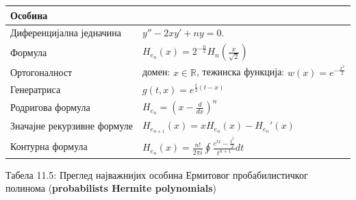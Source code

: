 {\def\LTcaptype{none} %
\begin{longtable}[]{@{}
  >{\raggedright\arraybackslash}p{}
  >{\centering\arraybackslash}p{}@{}}
\toprule\noalign{}
\begin{minipage}[b]{\linewidth}\raggedright
Особина
\end{minipage} & \begin{minipage}[b]{\linewidth}\centering
\end{minipage} \\
\midrule\noalign{}
\endhead
\bottomrule\noalign{}
\endlastfoot
Диференцијална једначина & \(y'' - 2xy' + ny = 0\). \\
Формула &
\(H_{e_{n}}(x) = 2^{- \frac{n}{2}}H_{n}(\frac{x}{\sqrt{2}})\) \\
Ортогоналност & домен: \(x\mathbb{\in R}\), тежинска функција:
\(w\overset{}{(x)} = e^{- \frac{x^{2}}{2}}\) \\
Генератриса & \(g(t,x) = e^{\frac{t}{2}(t - x)}\) \\
Родригова формула & \(H_{e_{n}} = {(x - \frac{d}{dx})}^{n}\) \\
Значајне рекурзивне формуле &
\(H_{e_{n + 1}}\overset{}{(x)} = xH_{e_{n}}\overset{}{(x)} - {H_{e_{n}}}'\overset{}{(x)}\) \\
Контурна формула &
\(H_{e_{n}}\overset{}{\overset{}{(x)}} = \frac{n!}{2\pi i}\oint\frac{e^{tx} - \frac{t^{2}}{2}}{t^{n + 1}}dt\) \\
\end{longtable}
}

Табела 11.5: Преглед најважнијих особина Ермитовог пробабилистичког
полинома (\textbf{probabilist\textquotesingle s Hermite polynomials})

